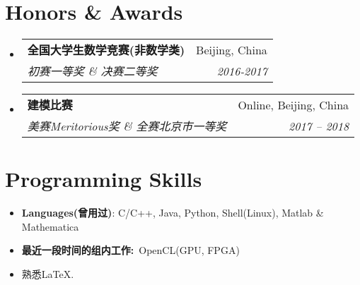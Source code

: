 \documentclass[letterpaper,11pt]{article}
\makeatletter
\newcommand{\resumeSubheading}[4]{
  \vspace{-1pt}\item
    \begin{tabular*}{0.97\textwidth}{l@{\extracolsep{\fill}}r}
      \textbf{#1} & #2 \\
      \textit{\small#3} & \textit{\small #4} \\
    \end{tabular*}\vspace{-5pt}
}
\newcommand{\resumeSubHeadingListStart}{\begin{itemize}[leftmargin=*]}
\newcommand{\resumeSubHeadingListEnd}{\end{itemize}}
\makeatother
\begin{document}
\section{Honors \& Awards}
\resumeSubHeadingListStart
\resumeSubheading
{全国大学生数学竞赛(非数学类)}{Beijing, China}
{初赛一等奖 \& 决赛二等奖}{2016-2017}
\resumeSubheading
{建模比赛}{Online, Beijing, China}
{美赛Meritorious奖 \& 全赛北京市一等奖}{2017 -- 2018}
\resumeSubHeadingListEnd

%
\section{Programming Skills}
 \resumeSubHeadingListStart
   \item{
     \textbf{Languages(曾用过)}{: C/C++, Java, Python, Shell(Linux), Matlab \& Mathematica}
     \hfill
   }
	\item{
	\textbf{最近一段时间的组内工作:}~OpenCL(GPU, FPGA)
}
	\item{熟悉LaTeX.}
 \resumeSubHeadingListEnd
\end{document}
